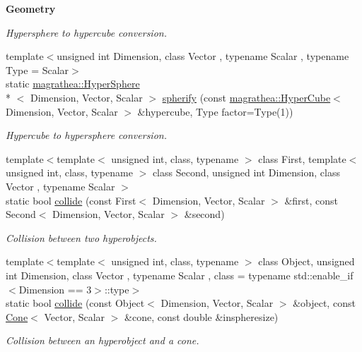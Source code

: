 \begin{Indent}{\bf Geometry}
\begin{DoxyCompactItemize}
\begin{DoxyCompactList}\small\item\em Hypersphere to hypercube conversion. \end{DoxyCompactList}\item 
{\footnotesize template$<$unsigned int Dimension, class Vector , typename Scalar , typename Type  = Scalar$>$ }\\static \hyperlink{exceptionmagrathea_1_1HyperSphere}{magrathea\-::\-Hyper\-Sphere}\\*
$<$ Dimension, Vector, Scalar $>$ \hyperlink{exceptionUtility_a70117b896ea38d46693ae3ab65138ac9}{spherify} (const \hyperlink{exceptionmagrathea_1_1HyperCube}{magrathea\-::\-Hyper\-Cube}$<$ Dimension, Vector, Scalar $>$ \&hypercube, Type factor=Type(1))
\begin{DoxyCompactList}\small\item\em Hypercube to hypersphere conversion. \end{DoxyCompactList}\item 
{\footnotesize template$<$template$<$ unsigned int, class, typename $>$ class First, template$<$ unsigned int, class, typename $>$ class Second, unsigned int Dimension, class Vector , typename Scalar $>$ }\\static bool \hyperlink{exceptionUtility_a2873ecf6f0fbe93e4a621a9b18d2d7f4}{collide} (const First$<$ Dimension, Vector, Scalar $>$ \&first, const Second$<$ Dimension, Vector, Scalar $>$ \&second)
\begin{DoxyCompactList}\small\item\em Collision between two hyperobjects. \end{DoxyCompactList}\item 
{\footnotesize template$<$template$<$ unsigned int, class, typename $>$ class Object, unsigned int Dimension, class Vector , typename Scalar , class  = typename std\-::enable\-\_\-if$<$\-Dimension == 3$>$\-::type$>$ }\\static bool \hyperlink{exceptionUtility_a4f5ab383fe36397bdcad52efcd74e221}{collide} (const Object$<$ Dimension, Vector, Scalar $>$ \&object, const \hyperlink{exceptionCone}{Cone}$<$ Vector, Scalar $>$ \&cone, const double \&inspheresize)
\begin{DoxyCompactList}\small\item\em Collision between an hyperobject and a cone. \end{DoxyCompactList}\end{DoxyCompactItemize}
\end{Indent}
